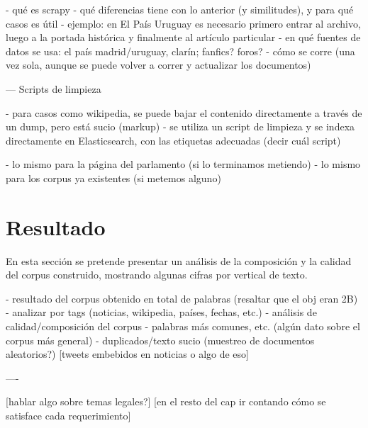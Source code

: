 - qué es scrapy
- qué diferencias tiene con lo anterior (y similitudes), y para qué casos es útil
    - ejemplo: en El País Uruguay es necesario primero entrar al archivo, luego a la portada
      histórica y finalmente al artículo particular
- en qué fuentes de datos se usa: el país madrid/uruguay, clarín; fanfics? foros?
- cómo se corre (una vez sola, aunque se puede volver a correr y actualizar los documentos)


--- Scripts de limpieza

- para casos como wikipedia, se puede bajar el contenido directamente a través de un dump, pero está
  sucio (markup)
- se utiliza un script de limpieza y se indexa directamente en Elasticsearch, con las etiquetas
  adecuadas (decir cuál script)

- lo mismo para la página del parlamento (si lo terminamos metiendo)
- lo mismo para los corpus ya existentes (si metemos alguno)


\section{Resultado}

En esta sección se pretende presentar un análisis de la composición y la calidad del corpus
construido, mostrando algunas cifras por vertical de texto.


- resultado del corpus obtenido en total de palabras (resaltar que el obj eran 2B)
- analizar por tags (noticias, wikipedia, países, fechas, etc.)
- análisis de calidad/composición del corpus
    - palabras más comunes, etc. (algún dato sobre el corpus más general)
    - duplicados/texto sucio (muestreo de documentos aleatorios?)
    [tweets embebidos en noticias o algo de eso]


----

[hablar algo sobre temas legales?]
[en el resto del cap ir contando cómo se satisface cada requerimiento]
